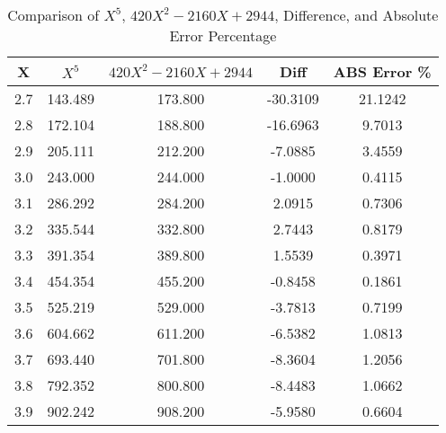 ﻿%
\begin{table}[h!]
    \centering
    \caption{Comparison of $X^5$, $420 X^2 - 2160 X + 2944$, Difference, and Absolute Error Percentage}
    \begin{tabular}{|c|c|c|c|c|}
        \hline
        \textbf{X} & \textbf{$X^5$} & \textbf{$420 X^2 - 2160 X + 2944$} & \textbf{Diff} & \textbf{ABS Error \%} \\ \hline
        2.7        & 143.489        & 173.800                            & -30.3109      & 21.1242               \\ \hline
        2.8        & 172.104        & 188.800                            & -16.6963      & 9.7013                \\ \hline
        2.9        & 205.111        & 212.200                            & -7.0885       & 3.4559                \\ \hline
        3.0        & 243.000        & 244.000                            & -1.0000       & 0.4115                \\ \hline
        3.1        & 286.292        & 284.200                            & 2.0915        & 0.7306                \\ \hline
        3.2        & 335.544        & 332.800                            & 2.7443        & 0.8179                \\ \hline
        3.3        & 391.354        & 389.800                            & 1.5539        & 0.3971                \\ \hline
        3.4        & 454.354        & 455.200                            & -0.8458       & 0.1861                \\ \hline
        3.5        & 525.219        & 529.000                            & -3.7813       & 0.7199                \\ \hline
        3.6        & 604.662        & 611.200                            & -6.5382       & 1.0813                \\ \hline
        3.7        & 693.440        & 701.800                            & -8.3604       & 1.2056                \\ \hline
        3.8        & 792.352        & 800.800                            & -8.4483       & 1.0662                \\ \hline
        3.9        & 902.242        & 908.200                            & -5.9580       & 0.6604                \\ \hline

\end{tabular}
\end{table}
